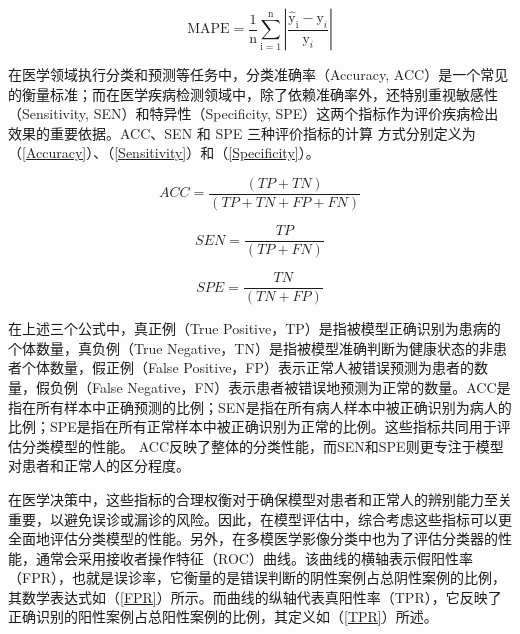\begin{equation}\label{MAPE}
\mathrm M\mathrm A\mathrm P\mathrm E=\frac{1}{\mathrm n}\sum_{\mathrm i=1}^\mathrm{n}\left|\frac{\hat{\mathrm y}_\mathrm{i}-\mathrm y_i}{\mathrm y_i}\right|
\end{equation}

在医学领域执行分类和预测等任务中，分类准确率（Accuracy, ACC）是一个常见的衡量标准；而在医学疾病检测领域中，除了依赖准确率外，还特别重视敏感性（Sensitivity, SEN）和特异性（Specificity, SPE）这两个指标作为评价疾病检出效果的重要依据。ACC、SEN 和 SPE 三种评价指标\cite{khedher2015early}的计算
方式分别定义为（\ref{Accuracy}）、（\ref{Sensitivity}）和（\ref{Specificity}）。

\begin{equation}\label{Accuracy}
ACC=\frac{(TP+TN)}{(TP+TN+FP+FN)}
\end{equation}

\begin{equation}\label{Sensitivity}
SEN=\frac{TP}{(TP+FN)}
\end{equation}

\begin{equation}\label{Specificity}
SPE=\frac{TN}{(TN+FP)}
\end{equation}

在上述三个公式中，真正例（True Positive，TP）是指被模型正确识别为患病的个体数量，真负例（True Negative，TN）是指被模型准确判断为健康状态的非患者个体数量，假正例（False Positive，FP）表示正常人被错误预测为患者的数量，假负例（False Negative，FN）表示患者被错误地预测为正常的数量。ACC是指在所有样本中正确预测的比例；SEN是指在所有病人样本中被正确识别为病人的比例；SPE是指在所有正常样本中被正确识别为正常的比例。这些指标共同用于评估分类模型的性能。
ACC反映了整体的分类性能，而SEN和SPE则更专注于模型对患者和正常人的区分程度。

在医学决策中，这些指标的合理权衡对于确保模型对患者和正常人的辨别能力至关重要，以避免误诊或漏诊的风险。因此，在模型评估中，综合考虑这些指标可以更全面地评估分类模型的性能。另外，在多模医学影像分类中也为了评估分类器的性能，通常会采用接收者操作特征（ROC）曲线。该曲线的横轴表示假阳性率（FPR），也就是误诊率，它衡量的是错误判断的阴性案例占总阴性案例的比例，其数学表达式如（\ref{FPR}）所示。而曲线的纵轴代表真阳性率（TPR），它反映了正确识别的阳性案例占总阳性案例的比例，其定义如（\ref{TPR}）所述。

